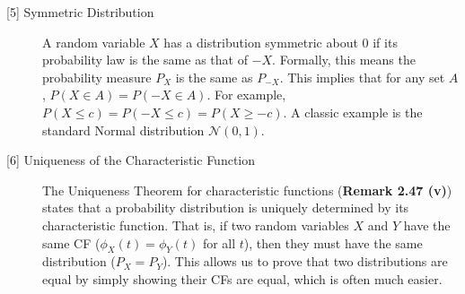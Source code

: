 \documentclass[11pt,a4paper]{article}
\begin{document}
\begin{description}
    \item[\hypertarget{note5}{[5] Symmetric Distribution}] A random variable $X$ has a distribution symmetric about 0 if its probability law is the same as that of $-X$. Formally, this means the probability measure $P_X$ is the same as $P_{-X}$. This implies that for any set $A$, $P(X \in A) = P(-X \in A)$. For example, $P(X \leq c) = P(-X \leq c) = P(X \geq -c)$. A classic example is the standard Normal distribution $\mathcal{N}(0,1)$.

    \item[\hypertarget{note6}{[6] Uniqueness of the Characteristic Function}] The Uniqueness Theorem for characteristic functions (\textbf{Remark 2.47 (v)}) states that a probability distribution is uniquely determined by its characteristic function. That is, if two random variables $X$ and $Y$ have the same CF ($\phi_X(t) = \phi_Y(t)$ for all $t$), then they must have the same distribution ($P_X = P_Y$). This allows us to prove that two distributions are equal by simply showing their CFs are equal, which is often much easier.

\end{description}
\end{document}
